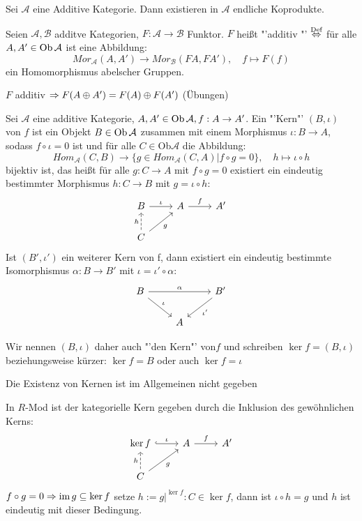 \begin{fo}
	Sei $\mathcal{A} $ eine Additive Kategorie. Dann existieren in $\mathcal{A} $  endliche Koprodukte. 
\end{fo}
\begin{df}
	Seien $ \mathcal{A}, \mathcal{B} $ additve Kategorien, $F: \mathcal{A} \to \mathcal{B}$ Funktor.
	 $F$ heißt "'additiv "' $\overset{\text{Def}}{\Leftrightarrow} $ für alle $ A, A' \in \text{Ob}\,\mathcal{A} $ ist eine Abbildung: $$ Mor_{\mathcal{A}}(A,A') \to  Mor_{\mathcal{B}}(FA,FA'), \quad f \mapsto F(f) $$ ein Homomorphismus abelscher Gruppen.
\end{df}
\begin{anm}
	$F$ additiv $\Rightarrow  F(A \oplus A' ) = F(A) \oplus F(A') $ (Übungen)
\end{anm}
\begin{bem+df}
	Sei $ \mathcal{A}$  eine additive Kategorie, $ A,A' \in \text{Ob}\,\mathcal{A}, f: A \to A' $. Ein "'Kern"' $(B,\iota) $ von $f$ ist ein Objekt $ B \in \text{Ob}\,\mathcal{A}$ zusammen mit einem Morphismus $ \iota: B \to A $, sodass $ f \circ \iota = 0 $ ist und für alle $ C \in$Ob$\mathcal{A}$  die Abbildung: $$Hom_{\mathcal{A}}(C,B) \longrightarrow \{g \in Hom_{\mathcal{A}}(C,A) | f \circ g = 0 \}, \quad h \mapsto \iota \circ h $$ bijektiv ist, das heißt für alle $g:C \to A $ mit $ f \circ g = 0 $ existiert ein eindeutig bestimmter Morphismus $ h: C \to B $ mit $ g = \iota \circ h$:
	$$\begin{tikzcd}
	B \arrow{r}{\iota}  & A \arrow{r}{f} & A' \\
	C \arrow[swap]{ur}{g}\arrow[dashed]{u}{h}
	\end{tikzcd}$$
	Ist $(B',\iota') $ ein weiterer Kern von f, dann existiert ein eindeutig bestimmte Isomorphismus $ \alpha: B \to B' $ mit $ \iota = \iota' \circ \alpha$:
	$$\begin{tikzcd}
	B\arrow{rr}{\alpha} \arrow{dr}{\iota} & & B'\arrow{dl}{\iota'}\\
	& A &
	\end{tikzcd}$$
	
	Wir nennen $(B,\iota) $ daher auch "'den Kern"' von$f$ und schreiben $ \ker f= (B,\iota)$ beziehungsweise kürzer: $ \ker f= B $ oder auch $\ker f = \iota$
\end{bem+df}
\begin{anm}
	Die Existenz von Kernen ist im Allgemeinen nicht gegeben
\end{anm}
\begin{bsp}
	In $R$-Mod ist der kategorielle Kern gegeben durch die Inklusion des gewöhnlichen Kerns:
	$$\begin{tikzcd}
	\ker f \arrow[hook]{r}{\iota} & A \arrow{r}{f} & A'\\C \arrow[swap]{ur}{g}\arrow[dashed]{u}{h}
	\end{tikzcd}$$
	$ f \circ g = 0 \Rightarrow \operatorname{im} g \subseteq \ker f $ setze  $ h := g\big|^{\ker f}:  C \in \ker f$, dann ist $ \iota\circ h = g $ und $h$ ist eindeutig mit dieser Bedingung.
\end{bsp}
